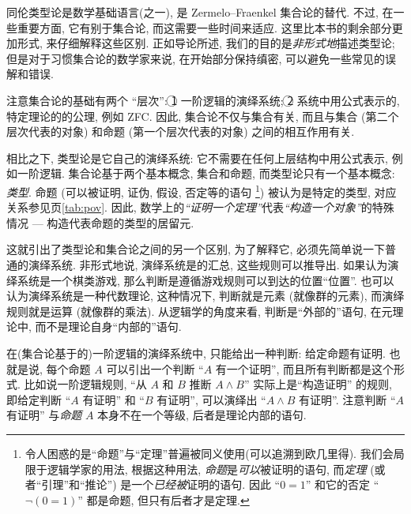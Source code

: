 \label{sec:axioms}

同伦类型论是数学基础语言(之一), 是 Zermelo–Fraenkel 集合论的替代.
不过, 在一些重要方面, 它有别于集合论, 而这需要一些时间来适应.
这里比本书的剩余部分更加形式, 来仔细解释这些区别.
正如导论所述, 我们的目的是\emph{非形式地}描述类型论;
但是对于习惯集合论的数学家来说, 在开始部分保持缜密, 可以避免一些常见的误解和错误.

注意集合论的基础有两个 ``层次'': \textcircled{1} 一阶逻辑的演绎系统; \textcircled{2} 系统中用公式表示的, 特定理论的的公理, 例如 ZFC.
因此, 集合论不仅与集合有关, 而且与集合 (第二个层次代表的对象) 和命题 (第一个层次代表的对象) 之间的相互作用有关.

相比之下, 类型论是它自己的演绎系统: 它不需要在任何上层结构中用公式表示, 例如一阶逻辑.
集合论基于两个基本概念, 集合和命题, 而类型论只有一个基本概念: \emph{类型}.
命题 (可以被证明, 证伪, 假设, 否定等的语句%
\footnote{令人困惑的是``命题''与``定理''普遍被同义使用(可以追溯到欧几里得).
我们会局限于逻辑学家的用法, 根据这种用法, \emph{命题}是\emph{可以}被证明的语句, 而\emph{定理}
%
(或者``引理''和``推论'')
是一个\emph{已经被}证明的语句.
因此 ``$0=1$'' 和它的否定 ``$\neg(0=1)$'' 都是命题, 但只有后者才是定理.})
被认为是特定的类型, 对应关系参见\pageref{tab:pov}页\cref{tab:pov}.
因此, 数学上的\emph{``证明一个定理''}代表\emph{``构造一个对象''}的特殊情况 --- 构造代表命题的类型的居留元.

%
这就引出了类型论和集合论之间的另一个区别, 为了解释它, 必须先简单说一下普通的演绎系统.
非形式地说, 演绎系统是的汇总,%
这些规则可以推导出. %
如果认为演绎系统是一个棋类游戏, %
那么判断是遵循游戏规则可以到达的位置``位置''.
也可以认为演绎系统是一种代数理论, 这种情况下, 判断就是元素 (就像群的元素), 而演绎规则就是运算 (就像群的乘法).
从逻辑学的角度来看,  判断是``外部的''语句, 在元理论中, 而不是理论自身``内部的''语句.

在(集合论基于的)一阶逻辑的演绎系统中, 只能给出一种判断: 给定命题有证明.
也就是说, 每个命题 $A$ 可以引出一个判断 ``$A$ 有一个证明'', 而且所有判断都是这个形式.
比如说一阶逻辑规则, ``从 $A$ 和 $B$ 推断 $A\wedge B$'' 实际上是``构造证明'' 的规则, 即给定判断 ``$A$ 有证明'' 和 ``$B$ 有证明'', 可以演绎出 ``$A\wedge B$ 有证明''.
注意判断 ``$A$ 有证明'' 与\emph{命题} $A$ 本身不在一个等级, 后者是理论内部的语句.


